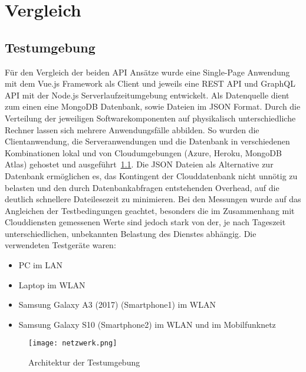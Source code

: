 \chapter{Vergleich}

\section{Testumgebung}
Für den Vergleich der beiden API Ansätze wurde eine Single-Page Anwendung mit dem Vue.js Framework als Client und jeweils eine REST API und GraphQL API mit der Node.js Serverlaufzeitumgebung entwickelt.
Als Datenquelle dient zum einen eine MongoDB Datenbank, sowie Dateien im JSON Format.
Durch die Verteilung der jeweiligen Softwarekomponenten auf physikalisch unterschiedliche Rechner lassen sich mehrere Anwendungsfälle abbilden.
So wurden die Clientanwendung, die Serveranwendungen und die Datenbank in verschiedenen Kombinationen lokal und von Cloudumgebungen (Azure, Heroku, MongoDB Atlas) gehostet und ausgeführt~\ref{img:netzwerk}.
Die JSON Dateien als Alternative zur Datenbank ermöglichen es, das Kontingent der Clouddatenbank nicht unnötig zu belasten und den durch Datenbankabfragen entstehenden Overhead, auf die deutlich schnellere Dateilesezeit zu minimieren.
Bei den Messungen wurde auf das Angleichen der Testbedingungen geachtet, besonders die im Zusammenhang mit Clouddiensten gemessenen Werte sind jedoch stark von der, je nach Tageszeit unterschiedlichen, unbekannten Belastung des Dienstes abhängig.
Die verwendeten Testgeräte waren:
\begin{itemize}
  \item PC im LAN
  \item Laptop im WLAN
  \item Samsung Galaxy A3 (2017) (Smartphone1) im WLAN
  \item Samsung Galaxy S10 (Smartphone2) im WLAN und im Mobilfunknetz
\end{itemize}
\begin{figure}[h]
  \centering
  \texttt{[image: netzwerk.png]}
  \caption{Architektur der Testumgebung}\label{img:netzwerk}
\end{figure}
